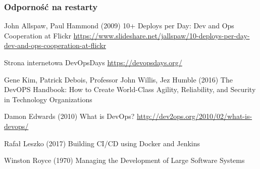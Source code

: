 \documentclass{article}
\begin{document}
\subsubsection{Odporność na restarty}



\begin{thebibliography}{9}

John Allspaw, Paul Hammond (2009) 10+ Deploys per Day: Dev and Ops Cooperation at Flickr \url{https://www.slideshare.net/jallspaw/10-deploys-per-day-dev-and-ops-cooperation-at-flickr}

Strona internetowa DevOpsDays \url{https://devopsdays.org/}

Gene Kim, Patrick Debois, Professor John Willis, Jez Humble (2016) The DevOPS Handbook: How to Create World-Class Agility, Reliability, and Security in Technology Organizations

Damon Edwards (2010) What is DevOps? \url{http://dev2ops.org/2010/02/what-is-devops/}

Rafał Leszko (2017) Building CI/CD using Docker and Jenkins

Winston Royce (1970) Managing the Development of Large Software Systems

\end{thebibliography}
\end{document}
